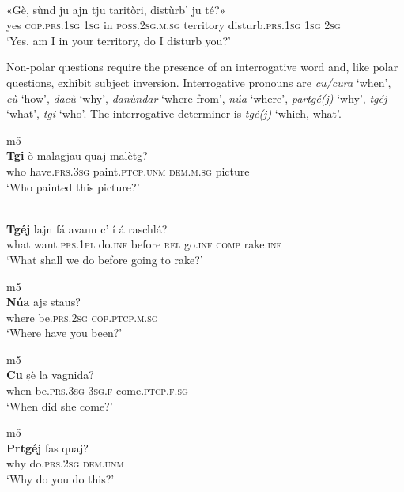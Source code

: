 \ea
\label{ex:interr1}
\\
\gll «Gè, sùnd ju ajn tju taritòri, distùrb’ ju té?»   \\
yes \textsc{cop.prs.1sg} \textsc{1sg} in \textsc{poss.2sg.m.sg} territory disturb.\textsc{prs.1sg} \textsc{1sg} \textsc{2sg} \\
\glt `Yes, am I in your territory, do I disturb you?'
\z

Non-polar questions require the presence of an interrogative word and, like polar questions, exhibit subject inversion. Interrogative pronouns are \textit{cu/cura} `when', \textit{cù} `how', \textit{dacù} `why', \textit{danùndar} `where from', \textit{núa} `where', \textit{partgé(j)} `why', \textit{tgéj} `what', \textit{tgi} `who'. The interrogative determiner is \textit{tgé(j)} `which, what'.


\ea
\label{}
 {m5}\\
\gll \textbf{Tgi} ò malagjau quaj malètg?\\
who have.\textsc{prs.3sg} paint.\textsc{ptcp.unm} \textsc{dem.m.sg} picture\\
\glt `Who painted this picture?'
\z


\ea
\label{}
 {\citealt[121]{Büchli1966}}\\
\gll \textbf{Tgéj} lajn fá avaun c' í á raschlá?\\
what want.\textsc{prs.1pl} do.\textsc{inf} before \textsc{rel} go.\textsc{inf} \textsc{comp} rake.\textsc{inf}\\
\glt `What shall we do before going to rake?'
\z

\ea
\label{}
 {m5}\\
\gll \textbf{Núa} ajs staus?\\
where be.\textsc{prs.2sg} \textsc{cop.ptcp.m.sg}\\
\glt `Where have you been?'
\z

\ea
\label{}
 {m5}\\
\gll \textbf{Cu} ṣè la vagnida?\\
when be.\textsc{prs.3sg} \textsc{3sg.f} come.\textsc{ptcp.f.sg}\\
\glt `When did she come?'
\z

\ea
\label{}
 {m5}\\
\gll \textbf{Prtgéj} fas quaj?\\
why do.\textsc{prs.2sg} \textsc{dem.unm}\\
\glt `Why do you do this?'
\z

